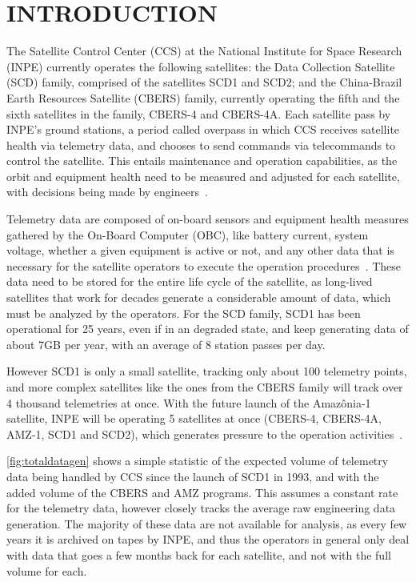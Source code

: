 
\chapter{INTRODUCTION}\label{ch:intro}

The Satellite Control Center (CCS) at the National Institute for Space Research (INPE) currently operates the following satellites: the Data Collection Satellite (SCD) family, comprised of the satellites SCD1 and SCD2; and the China-Brazil Earth Resources Satellite (CBERS) family, currently operating the fifth and the sixth satellites in the family, CBERS-4 and CBERS-4A.
Each satellite pass by INPE's ground stations, a period called overpass in which CCS receives satellite health via telemetry data, and chooses to send commands via telecommands to control the satellite.
This entails maintenance and operation capabilities, as the orbit and equipment health need to be measured and adjusted for each satellite, with decisions being made by engineers~\cite{AzevedoAmbr:2010:ArSaTe}.

Telemetry data are composed of on-board sensors and equipment health measures gathered by the On-Board Computer (OBC), like battery current, system voltage, whether a given equipment is active or not, and any other data that is necessary for the satellite operators to execute the operation procedures~\cite{larsonSpaceMissionAnalysis1999}.
These data need to be stored for the entire life cycle of the satellite, as long-lived satellites that work for decades generate a considerable amount of data, which must be analyzed by the operators.
For the SCD family, SCD1 has been operational for 25 years, even if in an degraded state, and keep generating data of about 7GB per year, with an average of 8 station passes per day.

However SCD1 is only a small satellite, tracking only about 100 telemetry points, and more complex satellites like the ones from the CBERS family will track over 4 thousand telemetries at once.
With the future launch of the Amazônia-1 satellite, INPE will be operating 5 satellites at once (CBERS-4, CBERS-4A, AMZ-1, SCD1 and SCD2), which generates pressure to the operation activities~\cite{JulioFoAmbrFerrLour:2017:ChImSp}.

\autoref{fig:totaldatagen} shows a simple statistic of the expected volume of telemetry data being handled by CCS since the launch of SCD1 in 1993, and with the added volume of the CBERS and AMZ programs.
This assumes a constant rate for the telemetry data, however closely tracks the average raw engineering data generation.
The majority of these data are not available for analysis, as every few years it is archived on tapes by INPE, and thus the operators in general only deal with data that goes a few months back for each satellite, and not with the full volume for each.

